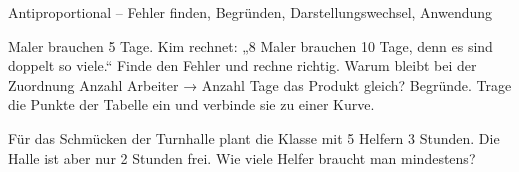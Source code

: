 \begin{aufgabe}{Antiproportional – Fehler finden, Begründen, Darstellungswechsel, Anwendung}
\begin{teile}
 Maler brauchen 5 Tage. Kim rechnet: „8 Maler brauchen 10 Tage, denn es sind doppelt so viele.“ Finde den Fehler und rechne richtig.
\teil Warum bleibt bei der Zuordnung Anzahl Arbeiter → Anzahl Tage das Produkt gleich? Begründe.
\teil Trage die Punkte der Tabelle ein und verbinde sie zu einer Kurve.

 \begin{ksys}[xmin=0,xmax=7,ymin=0,ymax=7,xlabel=Anzahl Kinder,ylabel=Stück je Kind]\end{ksys}
\teil Für das Schmücken der Turnhalle plant die Klasse mit 5 Helfern 3 Stunden. Die Halle ist aber nur 2 Stunden frei. Wie viele Helfer braucht man mindestens?
\end{teile}
\end{aufgabe}
